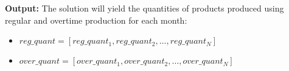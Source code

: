\documentclass{article}
\begin{document}
\textbf{Output:}
The solution will yield the quantities of products produced using regular and overtime production for each month:
\begin{itemize}
    \item $reg\_quant = [reg\_quant_{1}, reg\_quant_{2}, \ldots, reg\_quant_{N}]$
    \item $over\_quant = [over\_quant_{1}, over\_quant_{2}, \ldots, over\_quant_{N}]$
\end{itemize}
\end{document}
